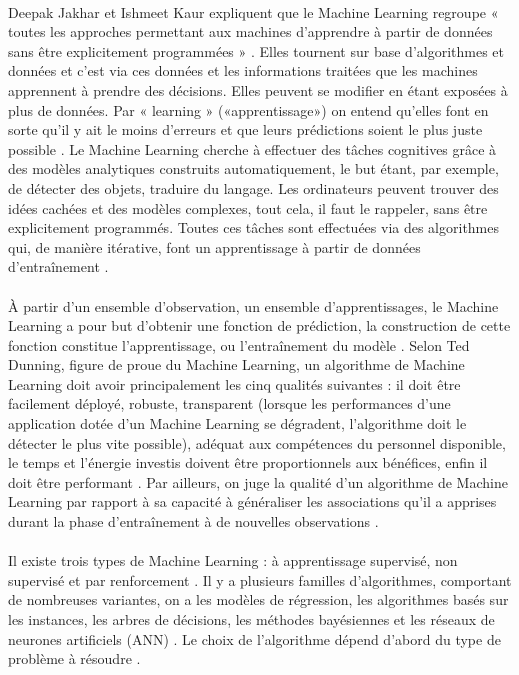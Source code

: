 \documentclass{article}
\begin{document}
\paragraph{}
Deepak Jakhar et Ishmeet Kaur expliquent que le Machine Learning regroupe « toutes les approches permettant aux machines d’apprendre à partir de données sans être explicitement programmées » \cite{jakhar2020artificial}. Elles tournent sur base d’algorithmes et données et c’est via ces données et les informations traitées que les machines apprennent à prendre des décisions. Elles peuvent se modifier en étant exposées à plus de données. Par « learning » («apprentissage») on entend qu’elles font en sorte qu’il y ait le moins d’erreurs et que leurs prédictions soient le plus juste possible \cite{jakhar2020artificial}. Le Machine Learning cherche à effectuer des tâches cognitives grâce à des modèles analytiques construits automatiquement, le but étant, par exemple, de détecter des objets, traduire du langage. Les ordinateurs peuvent trouver des idées cachées et des modèles complexes, tout cela, il faut le rappeler, sans être explicitement programmés. Toutes ces tâches sont effectuées via des algorithmes qui, de manière itérative, font un apprentissage à partir de données d’entraînement \cite{janiesch2021machine}. 
\paragraph{}
À partir d’un ensemble d’observation, un ensemble d’apprentissages, le Machine Learning a pour but d’obtenir une fonction de prédiction, la construction de cette fonction constitue l’apprentissage, ou l’entraînement du modèle \cite{lemberger2019big}. Selon Ted Dunning, figure de proue du Machine Learning, un algorithme de Machine Learning doit avoir principalement les cinq qualités suivantes : il doit être facilement déployé, robuste, transparent (lorsque les performances d’une application dotée d’un Machine Learning se dégradent, l’algorithme doit le détecter le plus vite possible), adéquat aux compétences du personnel disponible, le temps et l'énergie investis doivent être proportionnels aux bénéfices, enfin il doit être performant \cite{lemberger2019big}. Par ailleurs, on juge la qualité d’un algorithme de Machine Learning par rapport à sa capacité à généraliser les associations qu’il a apprises durant la phase d’entraînement à de nouvelles observations \cite{lemberger2019big}. 
\paragraph{}
Il existe trois types de Machine Learning : à apprentissage supervisé, non supervisé et par renforcement \cite{janiesch2021machine}. Il y a plusieurs familles d’algorithmes, comportant de nombreuses variantes, on a les modèles de régression, les algorithmes basés sur les instances, les arbres de décisions, les méthodes bayésiennes et les réseaux de neurones artificiels (ANN) \cite{janiesch2021machine}. Le choix de l’algorithme dépend d’abord du type de problème à résoudre \cite{lemberger2019big}.
\end{document}
